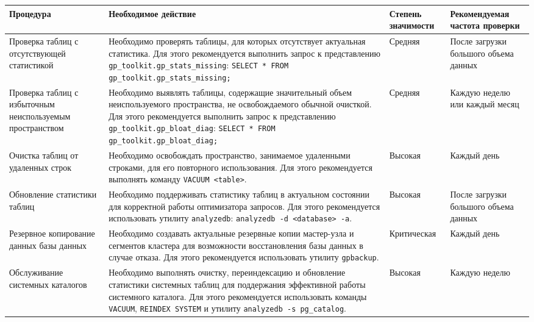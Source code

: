 \begin{enumerate}[1.]
{\begin{longtable}{|p{3.5cm}|p{6.5cm}|p{2.2cm}|p{2.8cm}|}
			\hline
			\textbf{Процедура} & \textbf{Необходимое действие} & \textbf{Степень значимости} & \textbf{Рекомендуемая частота проверки} \\
			\hline
			\endhead
			
			Проверка таблиц с отсутствующей статистикой &
			Необходимо проверять таблицы, для которых отсутствует актуальная статистика. Для этого рекомендуется выполнить запрос к представлению \texttt{gp\_toolkit.gp\_stats\_missing}: \texttt{SELECT * FROM gp\_toolkit.gp\_stats\_missing;} &
			Средняя & После загрузки большого объема данных \\
			\hline
			
			Проверка таблиц с избыточным неиспользуемым пространством &
			Необходимо выявлять таблицы, содержащие значительный объем неиспользуемого пространства, не освобождаемого обычной очисткой. Для этого рекомендуется выполнить запрос к представлению \texttt{gp\_toolkit.gp\_bloat\_diag}: \texttt{SELECT * FROM gp\_toolkit.gp\_bloat\_diag;} &
			Средняя & Каждую неделю или каждый месяц \\
			\hline
			
			Очистка таблиц от удаленных строк &
			Необходимо освобождать пространство, занимаемое удаленными строками, для его повторного использования. Для этого рекомендуется выполнять команду \texttt{VACUUM <table>}. &
			Высокая & Каждый день \\
			\hline
			
			Обновление статистики таблиц &
			Необходимо поддерживать статистику таблиц в актуальном состоянии для корректной работы оптимизатора запросов. Для этого рекомендуется использовать утилиту \texttt{analyzedb}: \texttt{analyzedb -d <database> -a}. &
			Высокая & После загрузки большого объема данных \\
			\hline
			
			Резервное копирование данных базы данных &
			Необходимо создавать актуальные резервные копии мастер-узла и сегментов кластера для возможности восстановления базы данных в случае отказа. Для этого рекомендуется использовать утилиту \texttt{gpbackup}. &
			Критическая & Каждый день \\
			\hline
			
			Обслуживание системных каталогов &
			Необходимо выполнять очистку, переиндексацию и обновление статистики системных таблиц для поддержания эффективной работы системного каталога. Для этого рекомендуется использовать команды \texttt{VACUUM}, \texttt{REINDEX SYSTEM} и утилиту \texttt{analyzedb -s pg\_catalog}. &
			Высокая & Каждую неделю \\
			\hline
		\end{longtable}
		
	}
	
\end{enumerate} 

